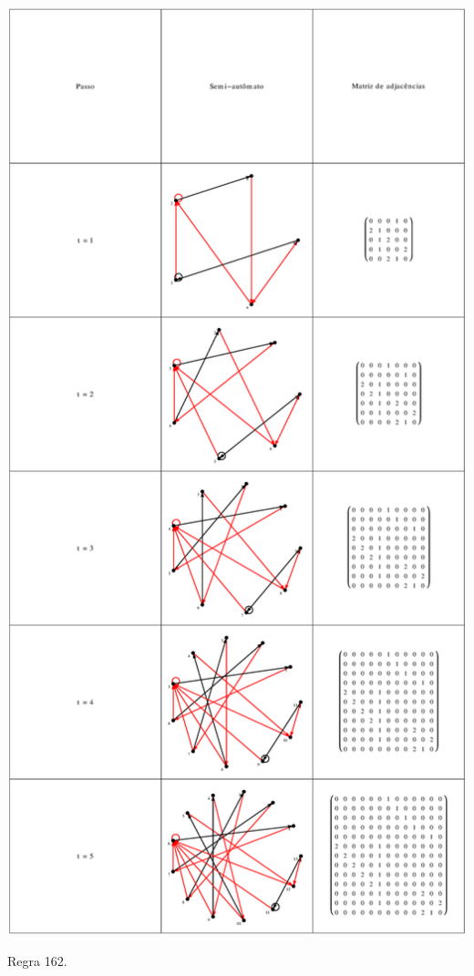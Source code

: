 \documentclass[12pt,a4paper]{article}
\begin{document}
\begin{table}[H]
\begin{center}
\includegraphics[scale=0.32]{img/mat/matr162.eps}
\caption{Regra 162.}
\label{tab:mr162}
\end{center}
\end{table}
\end{document}
